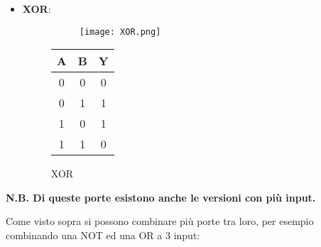 \documentclass{article}
\begin{document}
\begin{itemize}
\item \textbf{XOR}:

\begin{figure}[ht]
    \begin{minipage}[t]{0.49\textwidth}
        \centering
        \begin{figure}[H]
        \centering
        \texttt{[image: XOR.png]}
        \end{figure}
        \label{fig:xor}
    \end{minipage}
    \begin{minipage}[t]{0.49\textwidth}
    \centering
        \begin{table}[H]
        \centering
        \begin{tabular}{cc|c}
            A & B & Y\\
            \hline
            0 & 0 & 0\\
            \hline
            0 & 1 & 1\\
            \hline
            1 & 0 & 1\\
            \hline
            1 & 1 & 0\\
        \end{tabular}
    \label{tab:xor}
    \end{table}
\end{minipage}
\caption{XOR}
\end{figure}

\end{itemize}

\textbf{N.B. Di queste porte esistono anche le versioni con più input.}\newline

Come visto sopra si possono combinare più porte tra loro, per esempio combinando una NOT ed una OR a 3 input:
\end{document}
